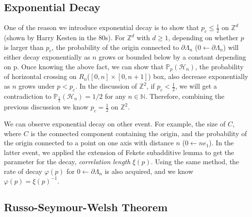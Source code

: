 \documentclass[12pt]{article}
\theoremstyle{plane}
\theoremstyle{definition}
\begin{document}
\subsection{Exponential Decay}\label{Course_Progress:Exponentia_Decay}
One of the reason we introduce exponential decay is to show that $p_c \leq \frac{1}{2}$ on $\mathbb{Z}^d$(shown by Harry Kesten in the 80s). 
For $\mathbb{Z}^d$ with $d\geq 1$, depending on whether $p$ is larger than $p_c$, the probability of the origin connected to $\partial \Lambda_n$  ($0 \longleftarrow \partial \Lambda_n$) will either decay exponentially as $n$ grows or bounded below by a constant depending on p. 
Once knowing the above fact, we can show that $\mathbb{P}_p (\mathcal{H}_n)$, the probability of horizontal crossing on $R_n$($[0,n]\times [0,n+1]$) box, also decrease exponentially as $n$ grows under $p < p_c$. 
In the discussion of $\mathbb{Z}^2$, if $p_c < \frac{1}{2}$, we will get a contradiction to $\mathbb{P}_{\frac{1}{2}}(\mathcal{H}_n) = 1/2$ for any $n \in \mathbb{N}$. Therefore, combining the previous discussion we know $p_c = \frac{1}{2}$ on $\mathbb{Z}^2$.

We can observe exponential decay on other event. For example, the size of $C$, where $C$ is the connected component containing the origin, and the probability of the origin connected to a point on one axis with distance $n$ ($0 \longleftarrow ne_1$). In the latter event, we applied the extension of Fekete subadditive lemma to get the parameter for the decay, \textit{correlation length} $\xi(p)$. 
Using the same method, the rate of decay $\varphi(p)$ for $0 \longleftarrow \partial \Lambda_n$ is also acquired, and we know $\varphi(p) = \xi(p)^{-1}$.

\subsection{Russo-Seymour-Welsh Theorem}
\end{document}
